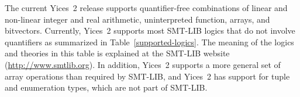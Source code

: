 \documentclass[11pt,twoside,fleqn,openright,titlepage]{cslreport}
\begin{document}
The current Yices~2 release supports quantifier-free combinations of
linear and non-linear integer and real arithmetic, uninterpreted
function, arrays, and bitvectors. Currently, Yices~2 supports most
SMT-LIB logics that do not involve quantifiers as summarized in
Table~\ref{supported-logics}.  The meaning of the logics and theories
in this table is explained at the SMT-LIB website
(\url{http://www.smtlib.org}).  In addition, Yices~2 supports a more
general set of array operations than required by SMT-LIB, and Yices~2
has support for tuple and enumeration types, which are not part of
SMT-LIB.


\newcommand{\desc}[1]{\parbox[c][1.6em][c]{9cm}{{\footnotesize #1}}}
\newcommand{\ddesc}[1]{\parbox[c][2.6em]{9cm}{{\footnotesize #1}}}
\end{document}
